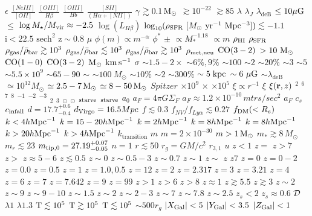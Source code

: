 $\epsilon$  $\frac{[NeIII]}{[OII]}$  $\frac{[OIII]}{H\beta}$  $\frac{[OIII]}{Hb}$  $\frac{[SII]}{(H\alpha +[NII])}$  $\gamma$  $\gtrsim 0.1 \, {\rm M}_\odot$  $\gtrsim 10^{-22}$  $\gtrsim{}85$  $\lambda$  $\lambda_J$  $\lambda_\text{deB}$  $\leq10\mu{\rm G}$  $\leqslant$  $\log M_\star/M_{\rm vir}\approx-2.5$  $\log(L_{H\beta})$  $\log_{10}(\rho_{\rm SFR}\ [M_\odot\ \mathrm{yr^{-1}\ Mpc^{-3}}])\lesssim-1.1$  $\mathrm{i}<22.5$  $\mathrm{sech^2}$  $\mathrm{z \sim 0.8}$  $\mu$  $\phi(m) \propto m^{-\alpha}$  $\phi^*$  $\pm$  $\propto M_*^{-1.18}$  $\propto m$  $\rho_{\rm HI}$  $\rho_{\rm SFR}$  $\rho_{\rm gas}/\bar{\rho}_{\rm bar}\gtrsim10^3$  $\rho_{\rm gas}/\bar{\rho}_{\rm bar}\lesssim10^3$  $\rho_{\rm gas}/\bar{\rho}_{\rm bar}\gtrsim10^3$  $\rho_{\rm met,neu}$  $\rm CO(3-2)$  $\rm > 10~ M_{\odot}$  $\rm CO(1-0)$  $\rm CO(3-2)$  $\rm M_{\odot}$  $\rm km\,s^{-1}$  $\sigma$  $\sim 1.5 - 2\times$  $\sim 6\%, 9\%$  $\sim 100$  $\sim 2$  $\sim 20\%$  $\sim 3$  $\sim 5$  $\sim 5.5 \times 10^{9}$  $\sim 65 - 90$  $\sim$  $\sim100~M_\odot$  $\sim10\%$  $\sim2$  $\sim300\%$  $\sim5\;{\rm kpc}$  $\sim6~\mu{\rm G}$  $\sim\lambda_\text{deB}$  $\simeq 10^{12}M_\odot$  $\simeq 2.5-7 \,{\rm M}_\odot$  $\simeq 8-50 \,{\rm M}_\odot$  $\textit{Spitzer}$  $\times 10^9$  $\times$  $\times10^5$  $\xi \propto r^{-1}$  $\xi$  $\xi({\bf r}, z)$  $^2$  $^6$  $^7$  $^8$  $^{-1}$  $^{-2}$  $^{-3}$  $_2$  $_3$  $_\odot$  $_{\odot}$  $_{\rm starve}$  $_{\rm starve}$  $a_0$  $a_F = 4 \pi G \Sigma_F$  $a_F \approx 1.2 \times 10^{-10}\, mtrs/sec^2$  $a_F$  $c_s$  $c_{\rm infall}$  $d=17.7^{+0.6}_{-0.4}$  $d_{\rm Virgo} = 16.5 Mpc$  $f\lesssim0.3$  $f_{NV}/f_{Ly\alpha} \lesssim 0.27$  $f_{\rm DM}(<R_e)$  $k<4h{\rm Mpc}^{-1}$  $k=15-20h{\rm Mpc}^{-1}$  $k=2h{\rm Mpc}^{-1}$  $k=8h{\rm Mpc}^{-1}$  $k=8h{\rm Mpc}^{-1}$  $k>20h{\rm Mpc}^{-1}$  $k>4h{\rm Mpc}^{-1}$  $k_\mathrm{transition}$  $m$  $m=2 \times 10^{-30}$  $m>1\,{\rm M}_\odot$  $m_* \gtrsim 8 \, M_\odot$  $m_r \lesssim 23$  $m_{\rm tip,0} = 27.19^{+0.07}_{-0.05}$  $n=1$  $r\lesssim 50$  $r_g=GM/c^2$  $r_{3,1}$  $u$  $z < 1$  $z =$  $z > 7$  $z >$  $z \approx 5 - 6$  $z \lesssim 0.5$  $z \sim 0$  $z \sim 0.5 - 3$  $z \sim 0.7$  $z \sim 1$  $z \sim$  $z$  $z7$  $z=0$  $z=0-2$  $z=0.0$  $z=0.5$  $z=1$  $z=1.0, 0.5$  $z=12$  $z=2$  $z=2.317$  $z=3$  $z=3.21$  $z=4$  $z=6$  $z=7$  $z=7.642$  $z=9$  $z=99$  $z>1$  $z>6$  $z>8$  $z\approx1$  $z\gtrsim5.5$  $z\gtrsim{}3$  $z\sim 2$  $z\sim 9$  $z\sim 9-10$  $z\sim1.5$  $z\sim2$  $z\sim2-3$  $z\sim7$  $z\sim7.8$  $z\sim{}2.5$  $z_s < 2$  $z_s\approx 0.6$  ${\cal D}$  ${\lambda}1$  ${\lambda}1.3$  ${\rm T}\lesssim10^{5}$  ${\rm T}\gtrsim10^{5}$  ${\rm T}\lesssim10^{5}$  ${\sim}500r_g$  $|X_{\rm Gal}| <5$  $|Y_{\rm Gal}| <3.5$  $|Z_{\rm Gal}| <1$

